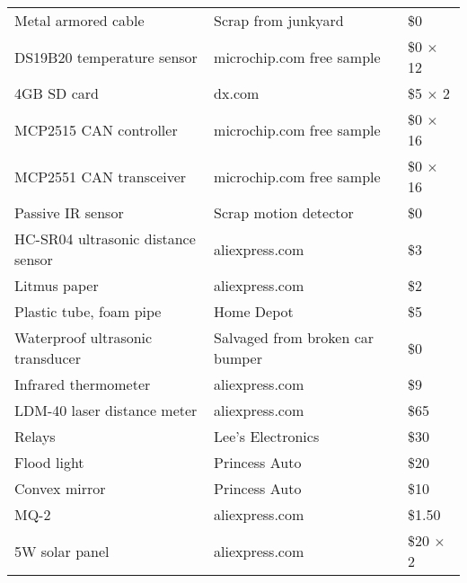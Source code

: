 \documentclass[12pt]{article}
\begin{document}
\begin{appendices}
\begin{tabular}{ |l|l|l| }
  Metal armored cable & Scrap from junkyard & \$0 \\
  DS19B20 temperature sensor & microchip.com free sample & \$0 $\times$ 12 \\
  4GB SD card & dx.com & \$5 $\times$ 2 \\
  MCP2515 CAN controller & microchip.com free sample & \$0 $\times$ 16 \\
  MCP2551 CAN transceiver & microchip.com free sample & \$0 $\times$ 16 \\
  Passive IR sensor & Scrap motion detector & \$0 \\
  HC-SR04 ultrasonic distance sensor & aliexpress.com & \$3 \\
  Litmus paper & aliexpress.com & \$2 \\
  Plastic tube, foam pipe & Home Depot & \$5 \\
  Waterproof ultrasonic transducer & Salvaged from broken car bumper & \$0 \\
  Infrared thermometer & aliexpress.com & \$9 \\
  LDM-40 laser distance meter & aliexpress.com & \$65 \\  
  Relays & Lee's Electronics & \$30 \\
  Flood light & Princess Auto & \$20 \\
  Convex mirror & Princess Auto & \$10 \\
  MQ-2 & aliexpress.com & \$1.50 \\
  5W solar panel & aliexpress.com & \$20 $\times$ 2 \\

  
  
\hline
\end{tabular}



\end{appendices}
\end{document}
